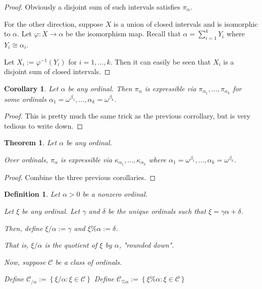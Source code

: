 \documentclass{article}
\newtheorem{theorem}{Theorem}
\newtheorem{corollary}{Corollary}
\newtheorem{definition}{Definition}
\newcommand{\braces}[1]{\left\{ {#1} \right\}}
\newcommand{\setcomp}[1]{\braces{#1}}
\newcommand{\kk}[1]{{\kappa}_{#1}}
\newcommand{\pp}[1]{{\pi}_{#1}}
\newcommand{\CC}{\mathcal{C}}
\begin{document}
\begin{proof}
    Obviously a disjoint sum of such
    intervals satisfies $\pp{\alpha}$.

    For the other direction, suppose $X$ is a union
    of closed intervals and
    is isomorphic to $\alpha$.
    Let $\varphi : X \to \alpha$ be the isomorphism map.
    Recall that $\alpha = \sum_{i=1}^k Y_i$ where
    $Y_i \cong \alpha_i$.
    
    Let $X_i := \varphi^{-1}(Y_i)$ for $i = 1, ..., k$.
    Then it can easily be seen that $X_i$ is
    a disjoint sum of closed intervals.
\end{proof}

\begin{corollary}
    Let $\alpha$ be any ordinal.
    Then $\pp{\alpha}$ is expressible via $\pp{\alpha_1}, ..., \pp{\alpha_k}$
    for some ordinals
    $\alpha_1 = \omega^{\beta_1}, ..., \alpha_k = \omega^{\beta_k}$.
\end{corollary}

\begin{proof}
    This is pretty much the same trick as the previous corrollary,
    but is very tedious to write down.
\end{proof}

\begin{theorem}
    Let $\alpha$ be any ordinal.

    Over ordinals, $\pp{\alpha}$ is expressible via
    $\kk{\alpha_1}, ..., \kk{\alpha_k}$
    where $\alpha_1 = \omega^{\beta_1}, ..., \alpha_k = \omega^{\beta_k}$.
\end{theorem}

\begin{proof}
    Combine the three previous corollaries.
\end{proof}

\begin{definition}
    Let $\alpha > 0$ be a nonzero ordinal.

    Let $\xi$ be any ordinal.
    Let $\gamma$ and $\delta$ be the unique ordinals
    such that $\xi = \gamma \alpha + \delta$.

    Then, define $\xi / \alpha := \gamma$ and $\xi \% \alpha := \delta$.

    That is, $\xi / \alpha$ is the quotient of $\xi$ by $\alpha$, "rounded down".

    Now, suppose $\CC$ be a class of ordinals.

    Define $\CC_{/\alpha} := \setcomp{\xi / \alpha : \xi \in \CC}$
    Define $\CC_{\% \alpha} := \setcomp{\xi \% \alpha : \xi \in \CC}$

\end{definition}
\end{document}
